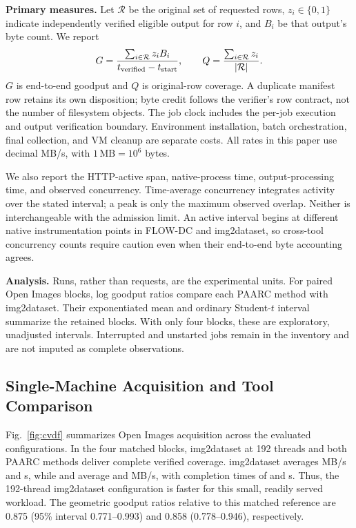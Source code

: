 \textbf{Primary measures.} Let $\mathcal R$ be the original set of requested rows, $z_i\in\{0,1\}$ indicate independently verified eligible output for row $i$, and $B_i$ be that output's byte count. We report
\begin{equation}
G=\frac{\sum_{i\in\mathcal R}z_iB_i}{t_{\rm verified}-t_{\rm start}},
\qquad
Q=\frac{\sum_{i\in\mathcal R}z_i}{|\mathcal R|}.
\label{eq:goodput}
\end{equation}
$G$ is end-to-end goodput and $Q$ is original-row coverage. A duplicate manifest row retains its own disposition; byte credit follows the verifier's row contract, not the number of filesystem objects. The job clock includes the per-job execution and output verification boundary. Environment installation, batch orchestration, final collection, and VM cleanup are separate costs. All rates in this paper use decimal MB/s, with $1\,\mathrm{MB}=10^6$ bytes.

We also report the HTTP-active span, native-process time, output-processing time, and observed concurrency. Time-average concurrency integrates activity over the stated interval; a peak is only the maximum observed overlap. Neither is interchangeable with the admission limit. An active interval begins at different native instrumentation points in FLOW-DC and img2dataset, so cross-tool concurrency counts require caution even when their end-to-end byte accounting agrees.

\textbf{Analysis.} Runs, rather than requests, are the experimental units. For paired Open Images blocks, log goodput ratios compare each PAARC method with img2dataset. Their exponentiated mean and ordinary Student-$t$ interval summarize the retained blocks. With only four blocks, these are exploratory, unadjusted intervals. Interrupted and unstarted jobs remain in the inventory and are not imputed as complete observations.

\subsection{Single-Machine Acquisition and Tool Comparison}
Fig.~\ref{fig:cvdf} summarizes Open Images acquisition across the evaluated configurations. In the four matched blocks, img2dataset at 192 threads and both PAARC methods deliver complete verified coverage. img2dataset averages \CVDFToolGoodput{} MB/s and \CVDFToolTime{} s, while \ratio{} and \paarc{} average \CVDFRatioGoodput{} and \CVDFPAARCGoodput{} MB/s, with completion times of \CVDFRatioTime{} and \CVDFPAARCTime{} s. Thus, the 192-thread img2dataset configuration is faster for this small, readily served workload. The geometric goodput ratios relative to this matched reference are 0.875 (95\% interval 0.771--0.993) and 0.858 (0.778--0.946), respectively.

